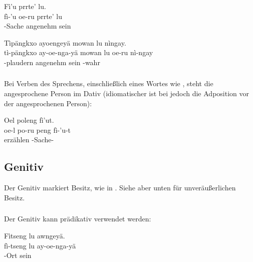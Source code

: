 \begin{interlin}
	\glll Fì'u  prrte' lu. \\
	fì-'u oe-ru prrte' lu \\
	-Sache  angenehm sein \\
\end{interlin}

\begin{interlin}
	\glll Tìpängkxo ayoengeyä mowan lu  nìngay. \\
	tì-pängkxo ay-oe-nga-yä mowan lu oe-ru nì-ngay \\
	-plaudern  angenehm sein  -wahr \\
\end{interlin}

\subsubsection{} Bei Verben des Sprechens, einschließlich eines Wortes wie  , steht die angesprochene Person im Dativ (idiomatischer ist bei  jedoch die Adposition  vor der angesprochenen Person):

\begin{interlin}
	\glll Oel  poleng fì'ut. \\
	oe-l po-ru peng fì-'u-t \\
	  erzählen -Sache- \\
\end{interlin}

\subsection{Genitiv} Der Genitiv markiert Besitz, wie in  . Siehe aber  unten für unveräußerlichen Besitz.

\subsubsection{} Der Genitiv kann prädikativ verwendet werden:

\begin{interlin}
	\glll Fìtseng lu awngeyä. \\
	fì-tseng lu ay-oe-nga-yä \\
	-Ort sein  \\
\end{interlin}

